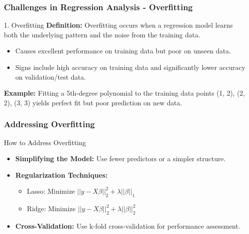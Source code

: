 \documentclass[aspectratio=169]{beamer}
\begin{document}
\begin{frame}[fragile]
    \frametitle{Challenges in Regression Analysis - Overfitting}
    \begin{block}{1. Overfitting}
        \textbf{Definition:} Overfitting occurs when a regression model learns both the underlying pattern and the noise from the training data. 

        \begin{itemize}
            \item Causes excellent performance on training data but poor on unseen data.
            \item Signs include high accuracy on training data and significantly lower accuracy on validation/test data.
        \end{itemize}
        
        \textbf{Example:} 
        Fitting a 5th-degree polynomial to the training data points (1, 2), (2, 2), (3, 3) yields perfect fit but poor prediction on new data.
    \end{block}
\end{frame}

\begin{frame}[fragile]
    \frametitle{Addressing Overfitting}
    \begin{block}{How to Address Overfitting}
        \begin{itemize}
            \item \textbf{Simplifying the Model:} Use fewer predictors or a simpler structure.
            \item \textbf{Regularization Techniques:} 
                \begin{itemize}
                    \item Lasso: Minimize \( ||y - X\beta||_2^2 + \lambda ||\beta||_1 \)
                    \item Ridge: Minimize \( ||y - X\beta||_2^2 + \lambda ||\beta||_2^2 \)
                \end{itemize}
            \item \textbf{Cross-Validation:} Use k-fold cross-validation for performance assessment.
        \end{itemize}
    \end{block}
\end{frame}
\end{document}
